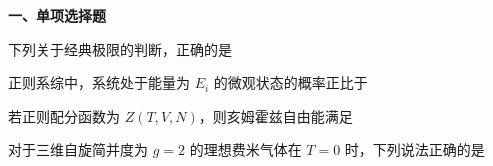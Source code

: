 ﻿


\textbf{一、单项选择题}

\begin{question}
下列关于经典极限的判断，正确的是
\begin{choiceoptions}[2]
\end{choiceoptions}

\begin{solution}
\end{solution}
\end{question}
\begin{question}
正则系综中，系统处于能量为 $E_i$ 的微观状态的概率正比于
\begin{choiceoptions}[2]
\end{choiceoptions}

\begin{solution}
\end{solution}
\end{question}
\begin{question}
若正则配分函数为 $Z(T,V,N)$，则亥姆霍兹自由能满足
\begin{choiceoptions}[2]
\end{choiceoptions}

\begin{solution}
\end{solution}
\end{question}
\begin{question}
对于三维自旋简并度为 $g=2$ 的理想费米气体在 $T=0$ 时，下列说法正确的是
\begin{choiceoptions}[2]
\end{choiceoptions}

\begin{solution}
\end{solution}
\end{question}
